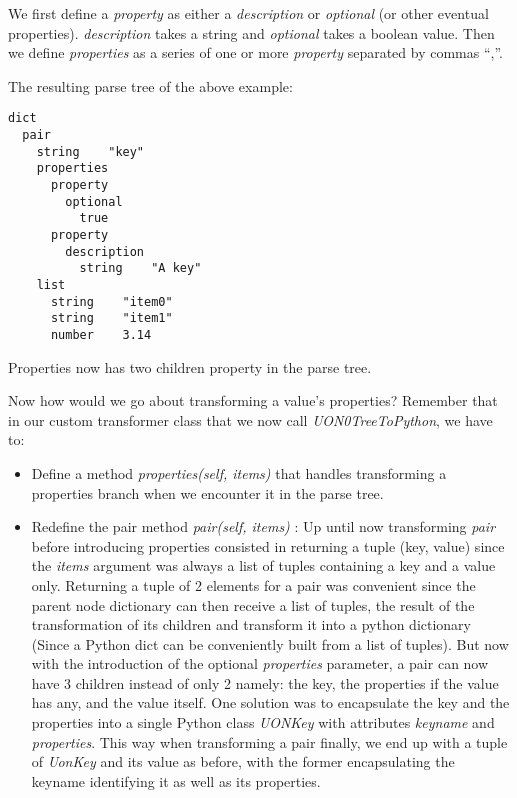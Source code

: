 \documentclass[12pt]{article}
\begin{document}
We first define a \emph{property} as either a \emph{description} or \emph{optional} (or other eventual properties). \emph{description} takes a string and \emph{optional} takes a boolean value. Then we define \emph{properties} as a series of one or more \emph{property} separated by commas “,”. 

The resulting parse tree of the above example:

\begin{lstlisting}
dict
  pair
    string    "key"
    properties
      property
        optional
          true
      property
        description
          string    "A key"
    list
      string    "item0"
      string    "item1"
      number    3.14

\end{lstlisting}

Properties now has two children property in the parse tree.

Now how would we go about transforming a value’s properties? Remember that in our custom transformer class that we now call \emph{UON0TreeToPython}, we have to:
\begin{itemize}
    \item Define a method \emph{properties(self, items)} that handles transforming a properties branch when we encounter it in the parse tree. 
    \item Redefine the pair method \emph{pair(self, items)} : Up until now transforming \emph{pair} before introducing properties consisted in returning a tuple (key, value) since the \emph{items} argument was always a list of tuples containing a key and a value only. Returning a tuple of 2 elements for a pair was convenient since the parent node dictionary can then receive a list of tuples, the result of the transformation of its children and transform it into a python dictionary (Since a Python dict can be conveniently built from a list of tuples). But now with the introduction of the optional \emph{properties} parameter, a pair can now have 3 children instead of only 2 namely: the key, the properties if the value has any, and the value itself. One solution was to encapsulate the key and the properties into a single Python class \emph{UONKey} with attributes \emph{keyname} and \emph{properties}. This way when transforming a pair finally, we end up with a tuple of \emph{UonKey} and its value as before, with the former encapsulating the keyname identifying it as well as its properties.
\end{itemize}
    
\end{document}
